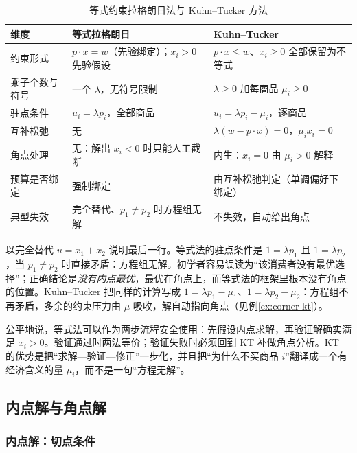 \begin{table}[H]
\centering
\caption{等式约束拉格朗日法与 Kuhn--Tucker 方法}
\label{tab:compare}
\begin{tabular}{@{}lp{5.1cm}p{5.9cm}@{}}
\toprule
维度 & 等式拉格朗日 & Kuhn--Tucker \\
\midrule
约束形式 & $p\cdot x=w$（先验绑定）；$x_i>0$ 先验假设 & $p\cdot x\le w$、$x_i\ge0$ 全部保留为不等式 \\
乘子个数与符号 & 一个 $\lambda$，无符号限制 & $\lambda\ge0$ 加每商品 $\mu_i\ge0$ \\
驻点条件 & $u_i=\lambda p_i$，全部商品 & $u_i=\lambda p_i-\mu_i$，逐商品 \\
互补松弛 & 无 & $\lambda(w-p\cdot x)=0$，$\mu_ix_i=0$ \\
角点处理 & 无：解出 $x_i<0$ 时只能人工截断 & 内生：$x_i=0$ 由 $\mu_i>0$ 解释 \\
预算是否绑定 & 强制绑定 & 由互补松弛判定（单调偏好下绑定） \\
典型失效 & 完全替代、$p_1\ne p_2$ 时方程组无解 & 不失效，自动给出角点 \\
\bottomrule
\end{tabular}
\end{table}

以完全替代 $u=x_1+x_2$ 说明最后一行。等式法的驻点条件是 $1=\lambda p_1$ 且 $1=\lambda p_2$，当 $p_1\ne p_2$ 时直接矛盾：方程组无解。初学者容易误读为“该消费者没有最优选择”；正确结论是\emph{没有内点最优}，最优在角点上，而等式法的框架里根本没有角点的位置。Kuhn--Tucker 把同样的计算写成 $1=\lambda p_1-\mu_1$、$1=\lambda p_2-\mu_2$：方程组不再矛盾，多余的约束压力由 $\mu$ 吸收，解自动指向角点（见例\ref{ex:corner-kt}）。

公平地说，等式法可以作为两步流程安全使用：先假设内点求解，再验证解确实满足 $x_i>0$。验证通过时两法等价；验证失败时必须回到 KT 补做角点分析。KT 的优势是把“求解—验证—修正”一步化，并且把“为什么不买商品 $i$”翻译成一个有经济含义的量 $\mu_i$，而不是一句“方程无解”。

\subsection{内点解与角点解}
\label{sec:interior-corner}

\subsubsection{内点解：切点条件}


